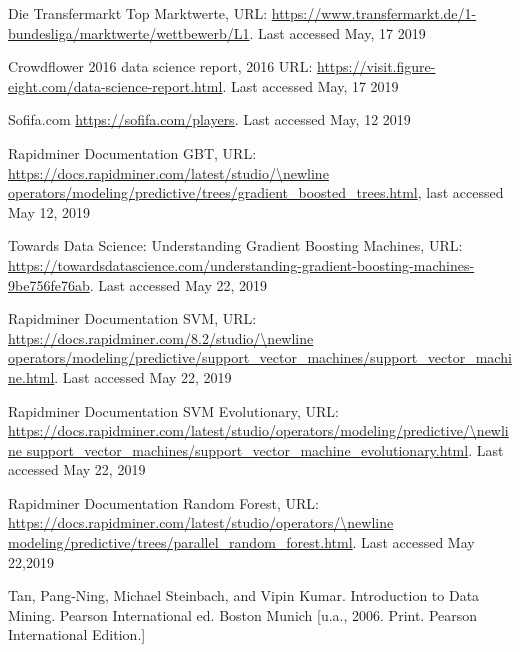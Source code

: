 \documentclass[runningheads]{llncs}
\begin{document}


%
\begin{thebibliography}{8}

Die Transfermarkt Top Marktwerte, URL: \url{https://www.transfermarkt.de/1-bundesliga/marktwerte/wettbewerb/L1}. Last accessed May, 17 2019

Crowdflower 2016 data science report, 2016   URL: \url{https://visit.figure-eight.com/data-science-report.html}. Last accessed May, 17 2019

Sofifa.com \url{https://sofifa.com/players}. Last accessed May, 12 2019

Rapidminer Documentation GBT, URL: \url{https://docs.rapidminer.com/latest/studio/\newline operators/modeling/predictive/trees/gradient\_boosted\_trees.html}, last accessed May 12, 2019


Towards Data Science: Understanding Gradient Boosting Machines, URL:  \url{https://towardsdatascience.com/understanding-gradient-boosting-machines-9be756fe76ab}. Last accessed May 22, 2019

Rapidminer Documentation SVM, URL: \url{https://docs.rapidminer.com/8.2/studio/\newline operators/modeling/predictive/support\_vector\_machines/support\_vector\_machine.html}. Last accessed May 22, 2019

Rapidminer Documentation SVM Evolutionary, URL: \url{https://docs.rapidminer.com/latest/studio/operators/modeling/predictive/\newline support\_vector\_machines/support\_vector\_machine\_evolutionary.html}. Last accessed May 22, 2019

Rapidminer Documentation Random Forest, URL: \url{https://docs.rapidminer.com/latest/studio/operators/\newline modeling/predictive/trees/parallel\_random\_forest.html}. Last accessed May 22,2019

Tan, Pang-Ning, Michael Steinbach, and Vipin Kumar. Introduction to Data Mining. Pearson International ed. Boston Munich [u.a., 2006. Print. Pearson International Edition.]



\end{thebibliography}
\end{document}

